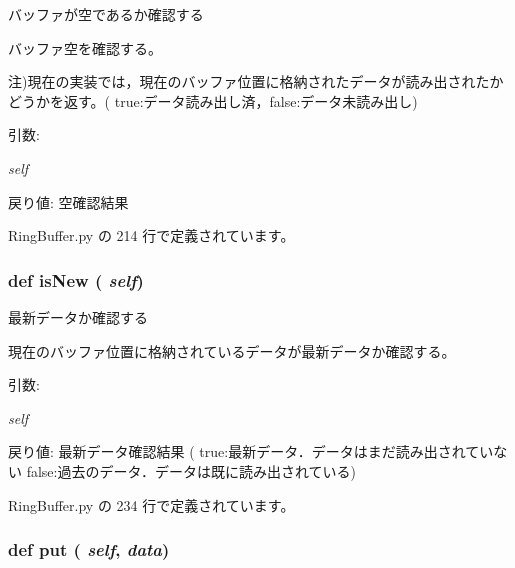 バッファが空であるか確認する 

バッファ空を確認する。

注)現在の実装では，現在のバッファ位置に格納されたデータが読み出されたか どうかを返す。( true:データ読み出し済，false:データ未読み出し)

\begin{Desc}
\item[引数:]
\begin{description}
\item[{\em self}]\end{description}
\end{Desc}
\begin{Desc}
\item[戻り値:]空確認結果 \end{Desc}


 RingBuffer.py の 214 行で定義されています。
\subsubsection{\setlength{\rightskip}{0pt plus 5cm}def isNew ( {\em self})}\label{classsource__py_1_1_ring_buffer_1_1_ring_buffer_a41773ac05767910a4cc7df88b7f814c}


最新データか確認する 

現在のバッファ位置に格納されているデータが最新データか確認する。

\begin{Desc}
\item[引数:]
\begin{description}
\item[{\em self}]\end{description}
\end{Desc}
\begin{Desc}
\item[戻り値:]最新データ確認結果 ( true:最新データ．データはまだ読み出されていない false:過去のデータ．データは既に読み出されている) \end{Desc}


 RingBuffer.py の 234 行で定義されています。
\subsubsection{\setlength{\rightskip}{0pt plus 5cm}def put ( {\em self},  {\em data})}\label{classsource__py_1_1_ring_buffer_1_1_ring_buffer_6b875be2179dd1eed37edd8d7fe079ff}


